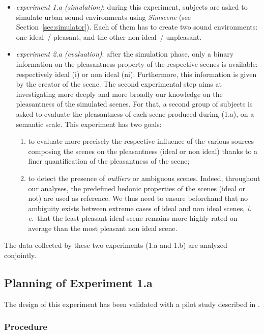 \documentclass[12pt]{elsarticle}
\newcommand{\ie}{\emph{i.\,e.}}
\begin{document}
\begin{itemize}
\item \emph{experiment 1.a (simulation)}: during this experiment, subjects are asked to simulate urban sound environments using \emph{Simscene} (see Section~\ref{sec:simulator}). Each of them has to create two sound environments: one ideal~/ pleasant, and the other non ideal~/ unpleasant.
\item \emph{experiment 2.a (evaluation)}: after the simulation phase, only a binary information on the pleasantness property of the respective scenes is available: respectively ideal (i) or non ideal (ni). Furthermore, this information is given by the creator of the scene. The second experimental step aims at investigating more deeply and more broadly our knowledge on the pleasantness of the simulated scenes. For that, a second group of subjects is asked to evaluate the pleasantness of each scene produced during (1.a), on a semantic scale. This experiment has two goals:
\begin{enumerate}
\item to evaluate more precisely the respective influence of the various sources composing the scenes on the pleasantness  (ideal or non ideal) thanks to a finer quantification of the pleasantness of the scene;
\item to detect the presence of \emph{outliers} or ambiguous scenes. Indeed, throughout our analyses, the predefined hedonic properties of the scenes (ideal or not) are used as reference. We thus need to ensure beforehand that no ambiguity exists between extreme cases of ideal and non ideal scenes, \ie~that the least pleasant ideal scene remains more highly rated on average than the most pleasant non ideal scene.
\end{enumerate}
\end{itemize}


The data collected by these two experiments (1.a and 1.b) are analyzed conjointly.

\subsection{Planning of Experiment 1.a}
\label{sec:xp1a_plan}

The design of this experiment has been validated with a pilot study described in \cite{lafay2014new}.

\subsubsection*{Procedure}
\end{document}
